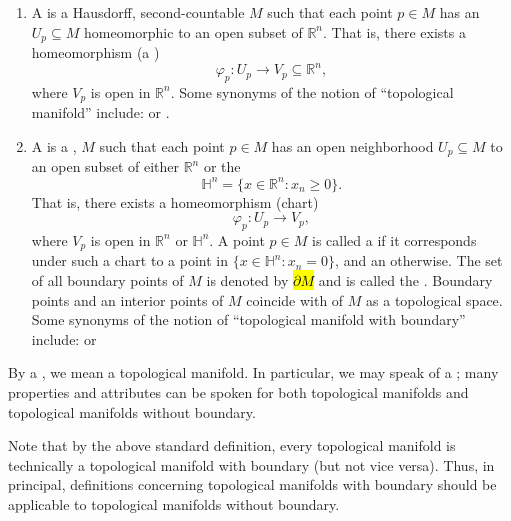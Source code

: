 \begin{definition}
    \label{definition:topological_manifold}
    \begin{enumerate}
        \item A  is a Hausdorff, second-countable  $M$ such that each point $p \in M$ has an  $U_p \subseteq M$ homeomorphic to an open subset of $\mathbb{R}^n$.  
        That is, there exists a homeomorphism (a )
        $$ \varphi_p : U_p \to V_p \subseteq \mathbb{R}^n, $$
        where $V_p$ is open in $\mathbb{R}^n$.
        Some synonyms of the notion of ``topological manifold'' include:  or .

        \item 
        A  is a ,   $M$ such that each point $p \in M$ has an open neighborhood $U_p \subseteq M$  to an open subset of either $\mathbb{R}^n$ or the 
        $$ \mathbb{H}^n = \{x \in \mathbb{R}^n : x_n \ge 0\}.  $$
        That is, there exists a homeomorphism (chart)
        $$ \varphi_p : U_p \to V_p, $$
        where $V_p$ is open in $\mathbb{R}^n$ or $\mathbb{H}^n$.  
        A point $p \in M$ is called a  if it corresponds under such a chart to a point in $\{x \in \mathbb{H}^n : x_n = 0\}$, and an  otherwise.  
        The set of all boundary points of $M$ is denoted by \hl{$\partial M$} and is called the . Boundary points and an interior points of $M$ coincide with  of $M$ as a topological space. Some synonyms of the notion of ``topological manifold with boundary'' include:  or 
    \end{enumerate}
    By a , we mean a topological manifold. In particular, we may speak of a ; many properties and attributes can be spoken for both topological manifolds and topological manifolds without boundary. 

    Note that by the above standard definition, every topological manifold is technically a topological manifold with boundary (but not vice versa). Thus, in principal, definitions concerning topological manifolds with boundary should be applicable to topological manifolds without boundary. 
\end{definition}
